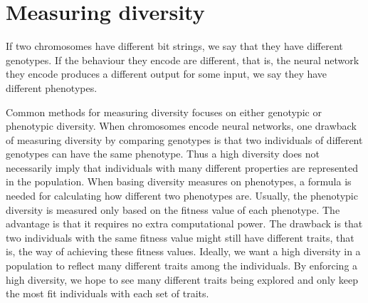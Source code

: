 \section{Measuring diversity}

If two chromosomes have different bit strings, we say that they have different genotypes.
If the behaviour they encode are different, that is, the neural network they encode produces a different output for some input,  we say they have different phenotypes.

Common methods for measuring diversity focuses on either genotypic or phenotypic diversity.
When chromosomes encode neural networks, one drawback of measuring diversity by comparing genotypes is that two individuals of different genotypes can have the same phenotype. Thus a high diversity does not necessarily imply that individuals with many different properties are represented in the population.
When basing diversity measures on phenotypes, a formula is needed for calculating how different two phenotypes are. 
Usually, the phenotypic diversity is measured only based on the fitness value of each phenotype.
The advantage is that it requires no extra computational power. 
The drawback is that two individuals with the same fitness value might still have different traits, that is, the way of achieving these fitness values. Ideally, we want a high diversity in a population to reflect many different traits among the individuals. By enforcing a high diversity, we hope to see many different traits being explored and only keep the most fit individuals with each set of traits.


